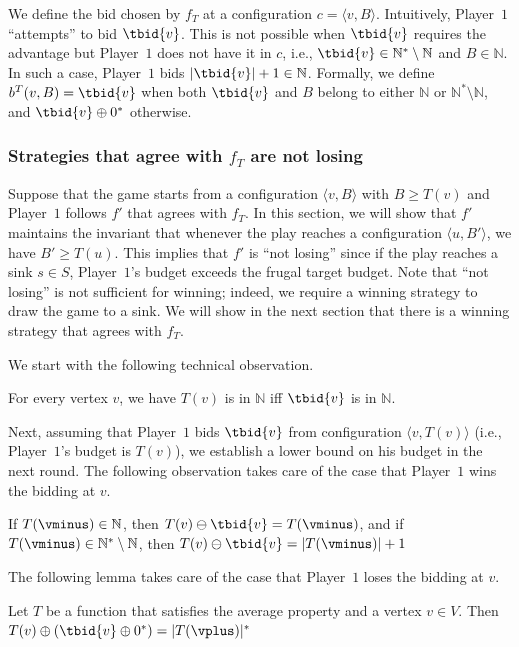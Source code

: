 \documentclass{article}\providecommand{\nequiv}{\not\equiv}\usepackage[a4paper,margin=20mm]{geometry}
\newcommand{\PO}{Player~$1$\xspace}
\newcommand{\Nat}{\mathbb{N}}
\newcommand{\Natstro}{\mathbb{N}^* \setminus \mathbb{N}}
\newcommand{\zug}[1]{\langle #1  \rangle}
\newcommand{\succb}[1]{#1 \oplus 0^*\xspace}
\newcommand{\absolut}[1]{|#1|}
\begin{document}
We define the bid chosen by $f_T$ at a configuration $c = \zug{v, B}$. 
Intuitively, \PO ``attempts'' to bid $\tbid{v}$. This is not possible when $\tbid{v}$ requires the advantage but \PO does not have it in $c$, i.e., $\tbid{v} \in \Nat^*\setminus \Nat$ and $B \in \Nat$. In such a case, \PO bids $\absolut{\tbid{v}} + 1 \in \Nat$. Formally, we define $b^T(v,B) = \tbid{v}$ when both $\tbid{v}$ and $B$ belong to either $\Nat$ or $\Nat^*\setminus \Nat$, and $\succb{\tbid{v}}$ otherwise. 

\subsubsection{Strategies that agree with $f_T$ are not losing}
Suppose that the game starts from a configuration $\zug{v, B}$ with $B \geq T(v)$ and \PO follows $f'$ that agrees with \(f_T\). In this section, we will show that $f'$ maintains the invariant that whenever the play reaches a configuration $\zug{u, B'}$, we have $B' \geq T(u)$. This implies that $f'$ is ``not losing'' since if the play reaches a sink $s \in S$, \PO's budget exceeds the frugal target budget. Note that ``not losing'' is not sufficient for winning; indeed, we require a winning strategy to draw the game to a sink. We will show in the next section that there is a winning strategy that agrees with $f_T$. 

We start with the following technical observation. 

\begin{observation}\label{obs: TmatcheswithBid}
	For every vertex $v$, we have \(T(v)\) is in \(\Nat\) iff \(\tbid{v}\) is in \(\Nat\).
\end{observation}

Next, assuming that \PO bids \(\tbid{v}\) from configuration $\zug{v, T(v)}$ (i.e., \PO's budget is $T(v)$), we establish a lower bound on his budget in the next round. The following observation takes care of the case that \PO wins the bidding at $v$. 

\begin{observation}\label{obs: AfterbidBudget}
	If \(T(\vminus) \in \Nat\), then \(T(v) \ominus \tbid{v}  = T(\vminus)\), and if \(T(\vminus) \in \Natstro\), then \(T(v) \ominus \tbid{v} = \absolut{T(\vminus)} + 1\)
\end{observation}

The following lemma takes care of the case that \PO loses the bidding at $v$. 

\begin{lemma}\label{lem:resultonT}
	Let $T$ be a function that satisfies the average property and a vertex $v \in V$. Then \(T(v) \oplus (\succb{\tbid{v}}) = \absolut{T(\vplus)}^*\)
\end{lemma}
\end{document}
